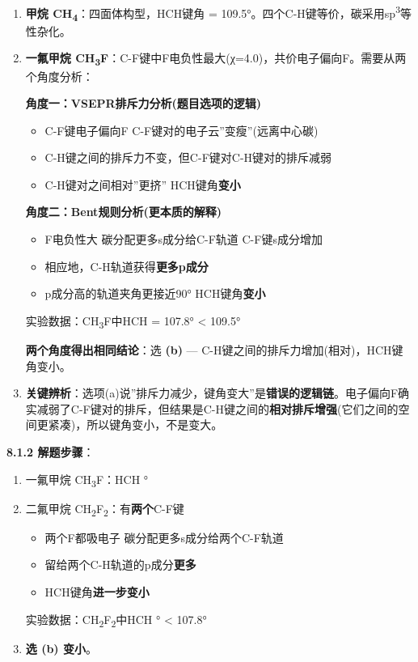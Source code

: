 \begin{enumerate}
\def\labelenumi{\arabic{enumi}.}
\item
  \textbf{甲烷 CH\textsubscript{4}}：四面体构型，HCH键角 = 109.5°。四个C-H键等价，碳采用sp\textsuperscript{3}等性杂化。
\item
  \textbf{一氟甲烷 CH\textsubscript{3}F}：C-F键中F电负性最大(χ=4.0)，共价电子偏向F。需要从两个角度分析：

  \textbf{角度一：VSEPR排斥力分析(题目选项的逻辑)}

  \begin{itemize}
  \tightlist
  \item
    C-F键电子偏向F \箭 C-F键对的电子云''变瘦''(远离中心碳)
  \item
    C-H键之间的排斥力不变，但C-F键对C-H键对的排斥减弱
  \item
    C-H键对之间相对''更挤'' \箭 HCH键角\textbf{变小}
  \end{itemize}

  \textbf{角度二：Bent规则分析(更本质的解释)}

  \begin{itemize}
  \tightlist
  \item
    F电负性大 \箭 碳分配更多s成分给C-F轨道 \箭 C-F键s成分增加
  \item
    相应地，C-H轨道获得\textbf{更多p成分}
  \item
    p成分高的轨道夹角更接近90° \箭 HCH键角\textbf{变小}
  \end{itemize}

  实验数据：CH\textsubscript{3}F中HCH = 107.8° \textless{} 109.5°

  \textbf{两个角度得出相同结论}：选 \textbf{(b)} --- C-H键之间的排斥力增加(相对)，HCH键角变小。
\item
  \textbf{关键辨析}：选项(a)说''排斥力减少，键角变大''是\textbf{错误的逻辑链}。电子偏向F确实减弱了C-F键对的排斥，但结果是C-H键之间的\textbf{相对排斥增强}(它们之间的空间更紧凑)，所以键角变小，不是变大。
\end{enumerate}

\textbf{8.1.2 解题步骤}：

\begin{enumerate}
\def\labelenumi{\arabic{enumi}.}
\item
  一氟甲烷 CH\textsubscript{3}F：HCH °
\item
  二氟甲烷 CH\textsubscript{2}F\textsubscript{2}：有\textbf{两个}C-F键

  \begin{itemize}
  \tightlist
  \item
    两个F都吸电子 \箭 碳分配更多s成分给两个C-F轨道
  \item
    留给两个C-H轨道的p成分\textbf{更多}
  \item
    HCH键角\textbf{进一步变小}
  \end{itemize}

  实验数据：CH\textsubscript{2}F\textsubscript{2}中HCH ° \textless{} 107.8°
\item
  \textbf{选 (b) 变小}。
\end{enumerate}

